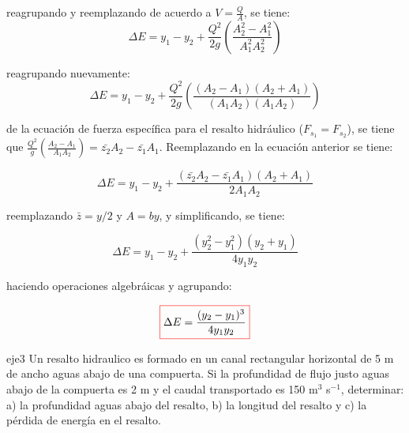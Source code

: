 \documentclass[11pt, oneside]{article}
\begin{document}
\begin{itemize}
reagrupando y reemplazando de acuerdo a $V=\frac{Q}{A}$, se tiene:
$$
\Delta E = y_1 - y_2 + \frac{Q^2}{2g}\left(\frac{A_2^2 - A_1^2}{A_1^2 A_2^2} \right)
$$

reagrupando nuevamente:
$$
\Delta E = y_1 - y_2 + \frac{Q^2}{2g}\left(\frac{(A_2 - A_1)(A_2 + A_1)}{(A_1 A_2)(A_1 A_2)} \right)
$$

de la ecuaci\'on de fuerza espec\'ifica para el resalto hidr\'aulico ($F_{s_1} = F_{s_2}$), se tiene que $\frac{Q^2}{g} \left(\frac{A_2 - A_1}{A_1 A_2} \right) = \bar{z_2}A_2 - \bar{z_1}A_1 $. Reemplazando en la ecuaci\'on anterior se tiene:

$$
\Delta E = y_1 - y_2 + \frac{(\bar{z_2}A_2 - \bar{z_1}A_1) (A_2 + A_1)}{2 A_1 A_2}
$$

reemplazando $\bar{z}=y/2$ y $A=by$, y simplificando, se tiene:

$$
\Delta E = y_1 - y_2 + \frac{(y_2^2 - y_1^2) (y_2 + y_1)}{4 y_1 y_2}
$$

haciendo operaciones algebr\'aicas y agrupando:

\begin{equation}
\color{red}\boxed{\color{black} \Delta E = \frac{(y_2 - y_1)^3}{4y_1 y_2}}
\label{ene23}
\end{equation}
\end{itemize}

\begin{eje}{}{eje3}
    Un resalto hidraulico es formado en un canal rectangular horizontal de 5 m de ancho aguas abajo de una compuerta. Si la profundidad de flujo justo aguas abajo de la compuerta es 2 m y el caudal transportado es 150 m$^3$ s$^{-1}$, determinar: a) la profundidad aguas abajo del resalto, b) la longitud del resalto y c) la p\'erdida de energ\'ia en el resalto.
\end{eje}


\end{document}
